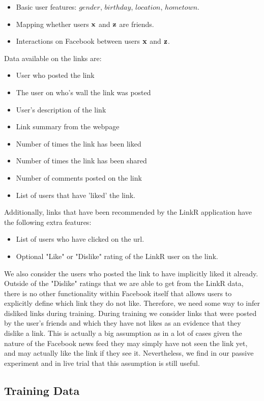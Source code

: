 \begin{itemize}
\item {Basic user features:  $gender$, $birthday$, $location$, $hometown$.}
\item {Mapping whether users $\mathbf{x}$ and $\mathbf{z}$ are friends.}
\item {Interactions on Facebook between users $\mathbf{x}$ and $\mathbf{z}$.}
\end{itemize}
Data available on the links are:
\begin{itemize}
\item{User who posted the link}
\item{The user on who's wall the link was posted}
\item{User's description of the link}
\item{Link summary from the webpage}
\item{Number of times the link has been liked}
\item{Number of times the link has been shared}
\item{Number of comments posted on the link}
\item{List of users that have 'liked' the link.}
\end{itemize}
Additionally, links that have been recommended by the LinkR application have the following extra features:
\begin{itemize}
\item{List of users who have clicked on the url.}
\item{Optional "Like" or "Dislike" rating of the LinkR user on the link.}
\end{itemize}

We also consider the users who posted the link to have implicitly liked it already. Outside of the "Dislike" ratings that we are able to get from the LinkR data, there is no other functionality within Facebook itself that allows users to explicitly define which link they do not like. Therefore, we need some way to infer disliked links during training. During training we consider links that were posted by the user's friends and which they have not likes as an evidence that they dislike a link. This is actually a big assumption as in a lot of cases given the nature of the Facebook news feed they may simply have not seen the link yet, and may actually like the link if they see it. Nevertheless, we find in our passive experiment and in live trial that this assumption is still useful.

\subsection{Training Data}

